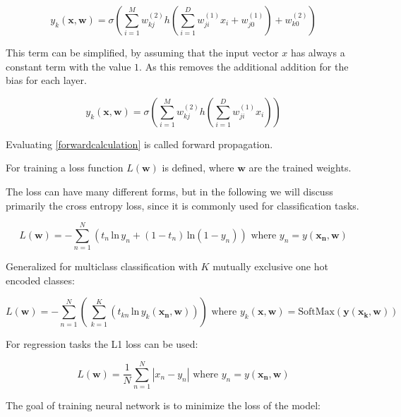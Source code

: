 \documentclass[draft,final,oneside]{vutinfth} %
\begin{document}
\begin{equation}
y_k(\boldsymbol{x}, \boldsymbol{w}) = \sigma\left(\sum_{i=1}^{M} w_{kj}^{(2)}h\left(\sum_{i=1}^{D} w_{ji}^{(1)}x_i + w_{j0}^{(1)}\right) + w_{k0}^{(2)}\right)
\end{equation}

This term can be simplified, by assuming that the input vector $x$ has always a constant term with the value $1$. As this removes the additional addition for the bias for each layer.

\begin{equation} \label{forwardcalculation}
y_k(\boldsymbol{x}, \boldsymbol{w}) = \sigma\left(\sum_{i=1}^{M} w_{kj}^{(2)}h\left(\sum_{i=1}^{D} w_{ji}^{(1)}x_i\right)\right)
\end{equation}

Evaluating \ref{forwardcalculation} is called forward propagation.

For training a loss function $L(\boldsymbol{w})$ is defined, where $\boldsymbol{w}$ are the trained weights.

The loss can have many different forms, but in the following we will discuss primarily the cross entropy loss, since it is commonly used for classification tasks.

\begin{equation}
L(\boldsymbol{w}) = -\sum_{n=1}^N \left( t_n\,\text{ln}\, y_n + (1 - t_n)\,\text{ln}(1 - y_n)\right) \text{ where } 
y_n = y(\boldsymbol{x_n}, \boldsymbol{w})
\end{equation}

Generalized for multiclass classification with $K$ mutually exclusive one hot encoded classes:

\begin{equation}
L(\boldsymbol{w}) = -\sum_{n=1}^N \left(\,\sum_{k=1}^K \left(t_{kn}\,\text{ln}\,y_k(\boldsymbol{x_n},\boldsymbol{w})\right)\right) \text{ where } y_k(\boldsymbol{x}, \boldsymbol{w}) = \text{SoftMax}(\boldsymbol{y}(\boldsymbol{x_k}, \boldsymbol{w}))
\end{equation}

For regression tasks the L1 loss can be used:

\begin{equation}
L(\boldsymbol{w}) = \dfrac{1}{N} \sum_{n=1}^N |x_n - y_n| \text{ where } 
y_n = y(\boldsymbol{x_n}, \boldsymbol{w})
\end{equation}

The goal of training neural network is to minimize the loss of the model:
\end{document}
